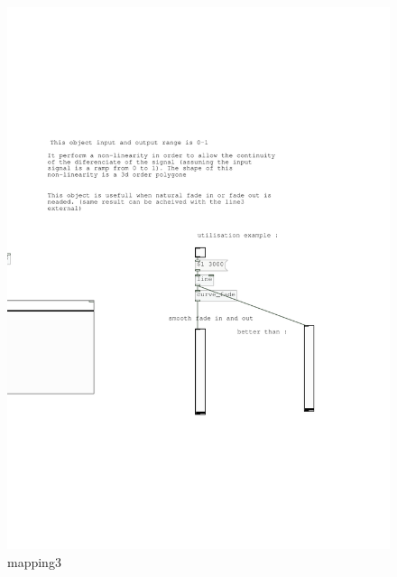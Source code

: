 \documentclass{ppgmus}
\begin{document}
\begin{figure}
\includegraphics[scale=.4]{mapping3}
\caption{mapping3}
\label{mapping3}
\end{figure}
\end{document}
